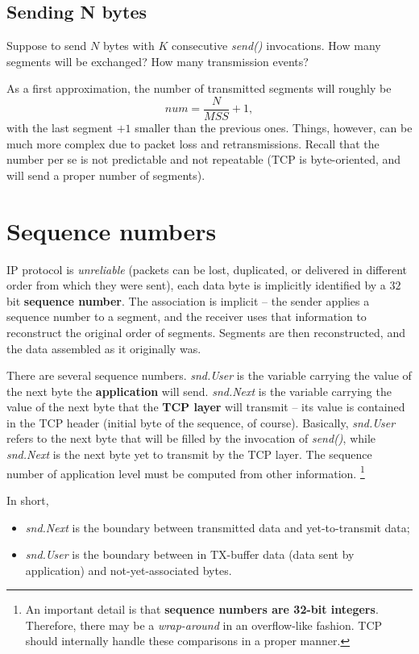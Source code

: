 \documentclass[a4paper, 11pt]{report}
\begin{document}
\subsection{Sending N bytes}

Suppose to send $N$ bytes with $K$ consecutive \emph{send()} invocations. How
many segments will be exchanged? How many transmission events?

As a first approximation, the number of transmitted segments will roughly be
$$num = \frac{N}{MSS} + 1,$$ with the last segment $+1$ smaller than the
previous ones. Things, however, can be much more complex due to packet loss and
retransmissions. Recall that the number per se is not predictable and not
repeatable (TCP is byte-oriented, and will send a proper number of segments).

\section{Sequence numbers}

IP protocol is \emph{unreliable} (packets can be lost, duplicated, or delivered
in different order from which they were sent), each data byte is implicitly
identified by a $32$ bit \textbf{sequence number}. The association is implicit
\--- the sender applies a sequence number to a segment, and the receiver uses
that information to reconstruct the original order of segments. Segments are
then reconstructed, and the data assembled as it originally was.

There are several sequence numbers. \emph{snd.User} is the variable carrying
the value of the next byte the \textbf{application} will send.
\emph{snd.Next} is the variable carrying the value of the next byte that the
\textbf{TCP layer} will transmit \--- its value is contained in the TCP header
(initial byte of the sequence, of course). Basically, \emph{snd.User} refers
to the next byte that will be filled by the invocation of \emph{send()},
while \emph{snd.Next} is the next byte yet to transmit by the TCP layer. The
sequence number of application level must be computed from other information.
\footnote{An important detail is that \textbf{sequence numbers are 32-bit integers}.
Therefore, there may be a \emph{wrap-around} in an overflow-like fashion. TCP
should internally handle these comparisons in a proper manner.}

In short,

\begin{itemize}
	\item \emph{snd.Next} is the boundary between transmitted data and
		yet-to-transmit data;
	\item \emph{snd.User} is the boundary between in TX-buffer data (data
		sent by application) and not-yet-associated bytes.
\end{itemize}
\end{document}
